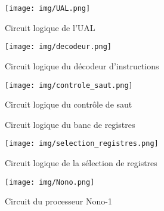 \documentclass[10pt,a4paper]{article}
\begin{document}
\begin{figure}[h]
\centering
\texttt{[image: img/UAL.png]}
\caption{Circuit logique de l'UAL}
\label{circuit_ual}
\end{figure}

\begin{figure}[h]
\centering
\texttt{[image: img/decodeur.png]}
\caption{Circuit logique du décodeur d'instructions}
\label{circuit_decodeur}
\end{figure}

\begin{figure}[h]
\centering
\texttt{[image: img/controle\_saut.png]}
\caption{Circuit logique du contrôle de saut}
\label{circuit_controle}
\end{figure}

\begin{figure}[h]
\centering
{}
\caption{Circuit logique du banc de registres}
\label{circuit_banc}
\end{figure}

\begin{figure}[h]
\centering
\texttt{[image: img/selection\_registres.png]}
\caption{Circuit logique de la sélection de registres}
\label{circuit_selection}
\end{figure}

\begin{figure}[h]
\centering
\texttt{[image: img/Nono.png]}
\caption{Circuit du processeur Nono-1}
\label{circuit_nono}
\end{figure}
\end{document}
